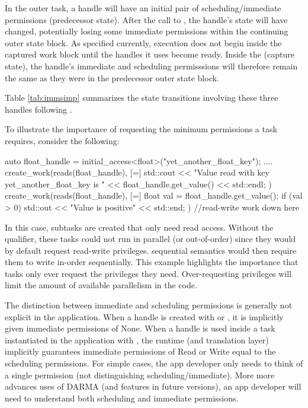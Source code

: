 In the outer \gls{task}, a \gls{handle} will have an initial pair of
scheduling/immediate permissions (predecessor state).
After the call to , the \gls{handle}'s state will have
changed, potentially losing some \gls{immediate permissions} within the
continuing outer state block.
As specified currently, execution does not begin inside the \gls{captured work}
block until the \glspl{handle} it uses become \gls{ready}.
Inside the \cwork (capture state), the \gls{handle}'s immediate and scheduling
permisssions will therefore remain the same as they were in the predecessor outer
state block.

Table \ref{tab:immsimp} summarizes the state transitions involving these three handles following \cwork.

To illustrate the importance of requesting the minimum permissions a \gls{task}
requires, consider the following:
\begin{CppCode}
auto float_handle = initial_access<float>("yet_another_float_key");
....
create_work(reads(float_handle), [=] {
  std::cout << "Value read with key yet_another_float_key is " 
          << float_handle.get_value() << std::endl;
})
create_work(reads(float_handle), [=] {
  float val = float_handle.get_value();
  if (val > 0) std::out << "Value is positive" << std::end;
})
//read-write work down here
\end{CppCode}
In this case, \glspl{subtask} are created that only need read access. 
Without the  qualifier, these \glspl{task} could not run in parallel (or out-of-order) since they
would by default request read-write privileges.
\Gls{sequential semantics} would then require them to write in-order sequentially.
This example highlights the importance that \glspl{task} only ever request the privileges they need. 
Over-requesting privileges will limit the amount of available parallelism in the code.


The distinction between immediate and scheduling permissions is generally not explicit in the application.
When a handle is created with  or ,
it is implicitly given immediate permissions of None.
When a handle is used inside a task instantiated in the application with ,
the runtime (and translation layer) implicitly guarantees immediate permissions of Read or Write equal to the scheduling permissions.
For simple cases, the app developer only needs to think of a single permission (not distinguishing scheduling/immediate).
More more advances uses of DARMA (and features in future versions), an app developer will need to understand both scheduling and immediate permissions.

